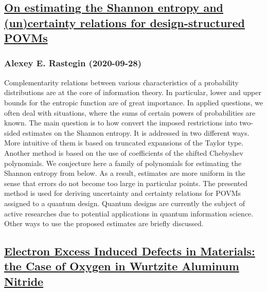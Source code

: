 \subsection*{\href{http://arxiv.org/abs/2009.13187v1}{On estimating the Shannon entropy and (un)certainty relations for  design-structured POVMs}}
\subsubsection*{Alexey E. Rastegin (2020-09-28)}
Complementarity relations between various characteristics of a probability
distributions are at the core of information theory. In particular, lower and
upper bounds for the entropic function are of great importance. In applied
questions, we often deal with situations, where the sums of certain powers of
probabilities are known. The main question is to how convert the imposed
restrictions into two-sided estimates on the Shannon entropy. It is addressed
in two different ways. More intuitive of them is based on truncated expansions
of the Taylor type. Another method is based on the use of coefficients of the
shifted Chebyshev polynomials. We conjecture here a family of polynomials for
estimating the Shannon entropy from below. As a result, estimates are more
uniform in the sense that errors do not become too large in particular points.
The presented method is used for deriving uncertainty and certainty relations
for POVMs assigned to a quantum design. Quantum designs are currently the
subject of active researches due to potential applications in quantum
information science. Other ways to use the proposed estimates are briefly
discussed.

\subsection*{\href{http://arxiv.org/abs/2009.13186v1}{Electron Excess Induced Defects in Materials: the Case of Oxygen in  Wurtzite Aluminum Nitride}}
